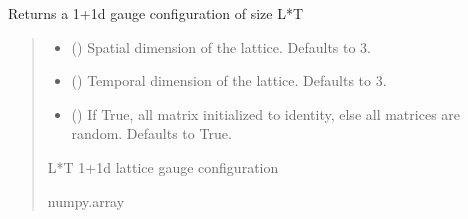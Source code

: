 \documentclass[letterpaper,10pt,english]{sphinxmanual}
\begin{document}
\begin{fulllineitems}
\label{\detokenize{gauge_su3:gauge_su3.init_conf}}
\pysigstartsignatures
\pysiglinewithargsret
{}
{\sphinxparamcomma {}\sphinxparamcomma {}}
{}
\pysigstopsignatures
\sphinxAtStartPar
Returns a 1+1d gauge configuration of size L*T
\begin{quote}\begin{description}
\begin{itemize}
\item {} 
\sphinxAtStartPar
{} (\sphinxstyleliteralemphasis{\sphinxupquote{, }}) \textendash{} Spatial dimension of the lattice. Defaults to 3.

\item {} 
\sphinxAtStartPar
{} (\sphinxstyleliteralemphasis{\sphinxupquote{, }}) \textendash{} Temporal dimension of the lattice. Defaults to 3.

\item {} 
\sphinxAtStartPar
{} (\sphinxstyleliteralemphasis{\sphinxupquote{, }}) \textendash{} If True, all matrix initialized to identity, else all matrices are random. Defaults to True.

\end{itemize}

\sphinxAtStartPar
L*T 1+1d lattice gauge configuration

\sphinxAtStartPar
numpy.array

\end{description}\end{quote}

\end{fulllineitems}

\end{document}
